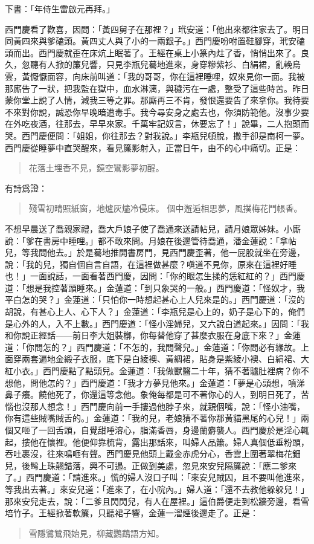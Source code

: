 下書：「年侍生雷啟元再拜。」

西門慶看了歡喜，因問：「黃四舅子在那裡？」玳安道：「他出來都往家去了。明日同黃四來與爹磕頭。黃四丈人與了小的一兩銀子。」西門慶吩咐置鞋腳穿，玳安磕頭而出。西門慶就歪在床炕上眠著了。王經在桌上小篆內炷了香，悄悄出來了。良久，忽聽有人掀的簾兒響，只見李瓶兒驀地進來，身穿糝紫衫、白絹裙，亂輓烏雲，黃懨懨面容，向床前叫道：「我的哥哥，你在這裡睡哩，奴來見你一面。我被那廝告了一狀，把我監在獄中，血水淋漓，與穢污在一處，整受了這些時苦。昨日蒙你堂上說了人情，減我三等之罪。那廝再三不肯，發恨還要告了來拿你。我待要不來對你說，誠恐你早晚暗遭毒手。我今尋安身之處去也，你須防範他。沒事少要在外吃夜酒，往那去，早早來家。千萬牢記奴言，休要忘了！」說畢，二人抱頭而哭。西門慶便問：「姐姐，你往那去？對我說。」李瓶兒頓脫，撒手卻是南柯一夢。西門慶從睡夢中直哭醒來，看見簾影射入，正當日午，由不的心中痛切。正是：
\begin{quote}
花落土埋香不見，鏡空鸞影夢初醒。
\end{quote}
有詩爲證：
\begin{quote}
殘雪初晴照紙窗，地爐灰燼冷侵床。
個中邂逅相思夢，風撲梅花鬥帳香。
\end{quote}

不想早晨送了喬親家禮，喬大戶娘子使了喬通來送請帖兒，請月娘眾姊妹。小廝說：「爹在書房中睡哩。」都不敢來問。月娘在後邊管待喬通，潘金蓮說：「拿帖兒，等我問他去。」於是驀地推開書房門，見西門慶歪著，他一屁股就坐在旁邊，說：「我的兒，獨自個自言自語，在這裡做甚麼？嗔道不見你，原來在這裡好睡也！」一面說話，一面看著西門慶，因問：「你的眼怎生揉的恁紅紅的？」西門慶道：「想是我控著頭睡來。」金蓮道：「到只象哭的一般。」西門慶道：「怪奴才，我平白怎的哭？」金蓮道：「只怕你一時想起甚心上人兒來是的。」西門慶道：「沒的胡說，有甚心上人、心下人？」金蓮道：「李瓶兒是心上的，奶子是心下的，俺們是心外的人，入不上數。」西門慶道：「怪小淫婦兒，又六說白道起來。」因問：「我和你說正經話——前日李大姐裝槨，你每替他穿了甚麼衣服在身底下來？」金蓮道：「你問怎的？」西門慶道：「不怎的，我問聲兒。」金蓮道：「你問必有緣故。上面穿兩套遍地金緞子衣服，底下是白綾襖、黃綢裙，貼身是紫綾小襖、白絹裙、大紅小衣。」西門慶點了點頭兒。金蓮道：「我做獸醫二十年，猜不著驢肚裡病？你不想他，問他怎的？」西門慶道：「我才方夢見他來。」金蓮道：「夢是心頭想，噴涕鼻子癢。饒他死了，你還這等念他。象俺每都是可不著你心的人，到明日死了，苦惱也沒那人想念！」西門慶向前一手摟過他脖子來，就親個嘴，說：「怪小油嘴，你有這些賊嘴賊舌的。」金蓮道：「我的兒，老娘猜不著你那黃貓黑尾的心兒！」兩個又咂了一回舌頭，自覺甜唾溶心，脂滿香唇，身邊蘭麝襲人。西門慶於是淫心輒起，摟他在懷裡。他便仰靠梳背，露出那話來，叫婦人品簫。婦人真個低垂粉頭，吞吐裹沒，往來鳴咂有聲。西門慶見他頭上戴金赤虎分心，香雲上圍著翠梅花鈿兒，後髩上珠翹錯落，興不可遏。正做到美處，忽見來安兒隔簾說：「應二爹來了。」西門慶道：「請進來。」慌的婦人沒口子叫：「來安兒賊囚，且不要叫他進來，等我出去著。」來安兒道：「進來了，在小院內。」婦人道：「還不去教他躲躲兒！」那來安兒走去，說：「二爹且閃閃兒，有人在屋裡。」這伯爵便走到松牆旁邊，看雪培竹子。王經掀著軟簾，只聽裙子響，金蓮一溜煙後邊走了。正是：
\begin{quote}
雪隱鷺鷥飛始見，柳藏鸚鵡語方知。
\end{quote}

